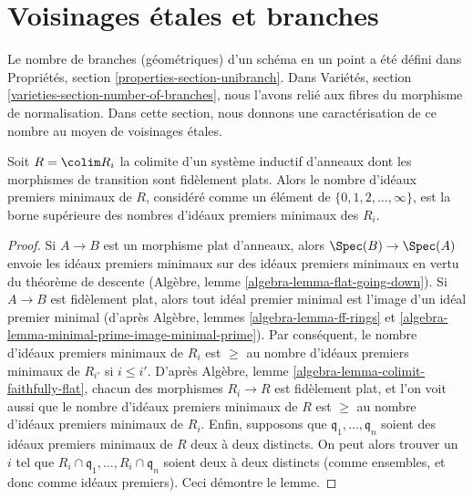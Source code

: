 \section{Voisinages \'etales et branches}
\label{section-etale-nbhds-branches}

\noindent
Le nombre de branches (géométriques) d'un schéma en un point a été
défini dans Propriétés, section \ref{properties-section-unibranch}.
Dans Variétés, section \ref{varieties-section-number-of-branches},
nous l'avons relié aux fibres du morphisme de normalisation.
Dans cette section, nous donnons une caractérisation de ce nombre au moyen de
voisinages \'etales.

\begin{lemma}
\label{lemma-nr-minimal-primes}
Soit $R = \colim R_i$ la colimite d'un système inductif d'anneaux
dont les morphismes de transition sont fidèlement plats.
Alors le nombre d'idéaux premiers minimaux de $R$,
considéré comme un élément de $\{0, 1, 2, \ldots, \infty\}$,
est la borne supérieure des nombres d'idéaux premiers minimaux des $R_i$.
\end{lemma}

\begin{proof}
Si $A \to B$ est un morphisme plat d'anneaux, alors $\Spec(B) \to \Spec(A)$
envoie les idéaux premiers minimaux sur des idéaux premiers minimaux en vertu du théorème de descente
(Algèbre, lemme \ref{algebra-lemma-flat-going-down}).
Si $A \to B$ est fidèlement plat, alors tout idéal premier
minimal est l'image d'un idéal premier minimal (d'après
Algèbre, lemmes \ref{algebra-lemma-ff-rings} et
\ref{algebra-lemma-minimal-prime-image-minimal-prime}).
Par conséquent, le nombre d'idéaux premiers minimaux de $R_i$ est
$\geq$ au nombre d'idéaux premiers minimaux de $R_{i'}$ si $i \leq i'$.
D'après Algèbre, lemme \ref{algebra-lemma-colimit-faithfully-flat},
chacun des morphismes $R_i \to R$ est
fidèlement plat, et l'on voit aussi que
le nombre d'idéaux premiers minimaux de $R$ est
$\geq$ au nombre d'idéaux premiers minimaux de $R_i$.
Enfin, supposons que $\mathfrak q_1, \ldots, \mathfrak q_n$
soient des idéaux premiers minimaux de $R$ deux à deux distincts. On peut alors
trouver un $i$ tel que $R_i \cap \mathfrak q_1, \ldots, R_i \cap \mathfrak q_n$
soient deux à deux distincts (comme ensembles, et donc comme idéaux premiers).
Ceci démontre le lemme.
\end{proof}

